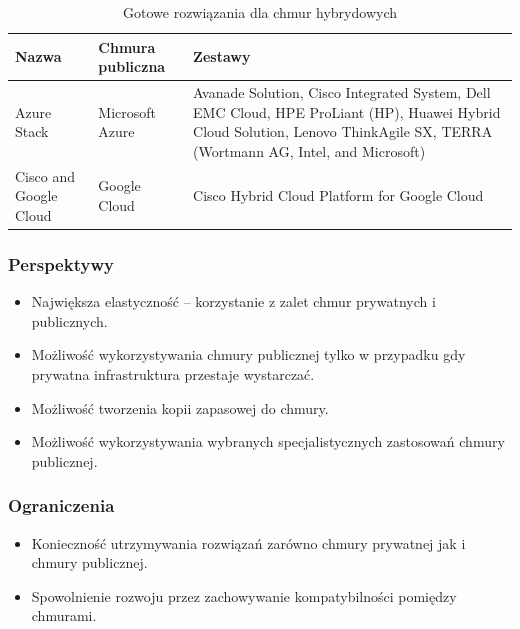 \documentclass[12pt,a4paper,twoside,titlepage,openright]{book}
\begin{document}
\noindent
\begin{small}
\begin{table}[h!]
%
\begin{tabularx}{\textwidth}{ |L|L|L| }

\hline
Nazwa & Chmura publiczna & Zestawy \\
\hline
Azure Stack \cite{siteAzureStack} & Microsoft Azure & 
Avanade Solution, \newline
Cisco Integrated System, \newline
Dell EMC Cloud, \newline
HPE ProLiant (HP), \newline
Huawei Hybrid Cloud Solution, \newline
Lenovo ThinkAgile SX, \newline
TERRA (Wortmann AG, Intel, and Microsoft) \\
\hline
Cisco and Google Cloud \cite{siteGoogleCisco} & Google Cloud & Cisco Hybrid Cloud Platform for Google Cloud \\
\hline


\end{tabularx}


\caption{Gotowe rozwiązania dla chmur hybrydowych}
		\label{table:hybridIntegrated}

\end{table}
\end{small}


\subsubsection{Perspektywy}
\begin{itemize}
\item Największa elastyczność -- korzystanie z zalet chmur prywatnych i publicznych.
\item Możliwość wykorzystywania chmury publicznej tylko w przypadku gdy prywatna infrastruktura przestaje wystarczać.
\item Możliwość tworzenia kopii zapasowej do chmury.
\item Możliwość wykorzystywania wybranych specjalistycznych zastosowań chmury publicznej.
\end{itemize}

\subsubsection{Ograniczenia}
\begin{itemize}
\item Konieczność utrzymywania rozwiązań zarówno chmury prywatnej jak i chmury publicznej.
\item Spowolnienie rozwoju przez zachowywanie kompatybilności pomiędzy chmurami.
\end{itemize}
\end{document}
